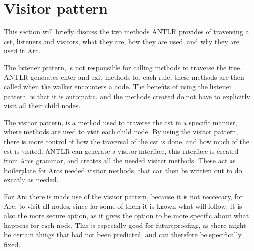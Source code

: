\section{Visitor pattern}\label{sec:visitorpattern}
This section will briefly discuss the two methods ANTLR provides of traversing a \gls{cst}, listeners and visitors, what they are, how they are used, and why they are used in Arc.

The listener pattern, is not responsible for calling methods to traverse the tree. ANTLR generates enter and exit methods for each rule, these methods are then called when the walker encounters a node. The benefits of using the listener pattern, is that it is automatic, and the methods created do not have to explicitly visit all their child nodes\cite{Parr2014}. 

The visitor pattern, is a method used to traverse the \gls{cst} in a specific manner, where methods are used to visit each child node. By using the visitor pattern, there is more control of how the traversal of the \gls{cst} is done, and how much of the \gls{cst} is visited. ANTLR can generate a visitor interface, this interface is created from Arcs grammar, and creates all the needed visitor methods. These act as boilerplate for Arcs needed visitor methods, that can then be written out to do excatly as needed\cite{Parr2014}.

For Arc there is made use of the visitor pattern, because it is not neccecary, for Arc, to visit all nodes, since for some of them it is known what will follow. It is also the more secure option, as it gives the option to be more specific about what happens for each node. This is especially good for futureproofing, as there might be certain things that had not been predicted, and can therefore be specifically fixed.


